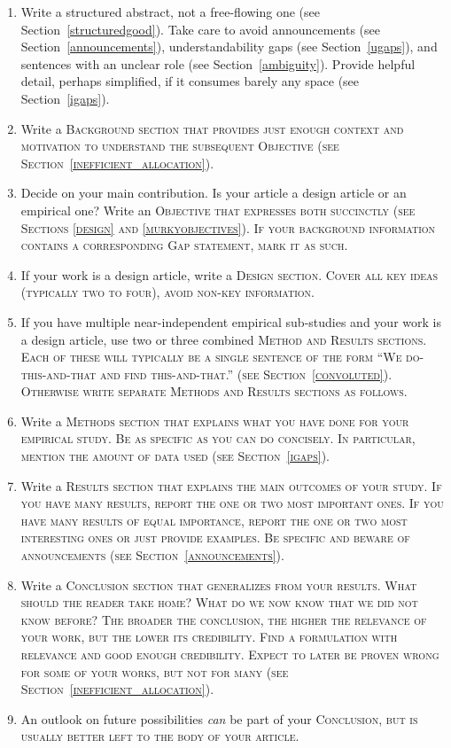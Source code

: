 \documentclass[10pt,journal,compsoc]{IEEEtran}
\newcommand{\Sah}[1]{\bgroup\scshape #1\egroup}  %
\begin{document}
\begin{enumerate}
  \item Write a structured abstract, not a free-flowing one 
    (see Section~\ref{structuredgood}).
    Take care to avoid announcements (see Section~\ref{announcements}),
    understandability gaps (see Section~\ref{ugaps}),
    and sentences with an unclear role (see Section~\ref{ambiguity}).
    Provide helpful detail, perhaps simplified, if it consumes barely any space
    (see Section~\ref{igaps}).
  \item Write a \Sah{Background} section that provides just enough context
    and motivation to understand the subsequent \Sah{Objective} 
    (see Section~\ref{inefficient_allocation}).
  \item Decide on your main contribution. 
    Is your article a design article or an empirical one?
    Write an \Sah{Objective} that expresses both succinctly 
    (see Sections \ref{design} and \ref{murkyobjectives}).
    If your background information contains a corresponding \Sah{Gap} statement,
    mark it as such.
  \item If your work is a design article, 
    write a \Sah{Design} section.
    Cover all key ideas (typically two to four), avoid non-key information.
  \item If you have multiple near-independent empirical sub-studies and
    your work is a design article,
    use two or three combined \Sah{Method and Results} sections.
    Each of these will typically be a single sentence of the form
    ``We do-this-and-that and find this-and-that.''
    (see Section~\ref{convoluted}).
    Otherwise write separate \Sah{Methods} and \Sah{Results} sections
    as follows.
  \item Write a \Sah{Methods} section that explains what you have done
    for your empirical study. 
    Be as specific as you can do concisely.
    In particular, mention the amount of data used (see Section~\ref{igaps}).
  \item Write a \Sah{Results} section that explains the main outcomes
    of your study.
    If you have many results, report the one or two most important ones.
    If you have many results of equal importance, report the 
    one or two most interesting ones or just provide examples.
    Be specific and beware of announcements (see Section~\ref{announcements}).
  \item Write a \Sah{Conclusion} section that generalizes from your results.
    What should the reader take home?
    What do we now know that we did not know before?
    The broader the conclusion, the higher the relevance of your work,
    but the lower its credibility. 
    Find a formulation with relevance and good enough credibility.
    Expect to later be proven wrong for some of your works, but not for many
    (see Section~\ref{inefficient_allocation}).
  \item An outlook on future possibilities \emph{can} be part of your \Sah{Conclusion},
    but is usually better left to the body of your article.
\end{enumerate}
\end{document}
